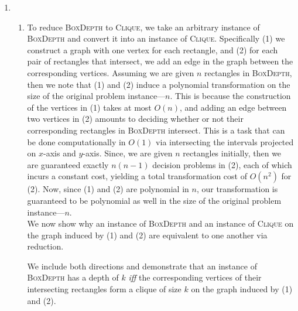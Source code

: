 \documentclass[10pt, letterpaper]{article}
\begin{document}
\begin{enumerate}[label={\bfseries Q\arabic*.}]
  \item
    \begin{enumerate}
      \item
        To reduce \textsc{BoxDepth} to \textsc{Clique}, we take an arbitrary instance of
        \textsc{BoxDepth} and convert it into an instance of \textsc{Clique}. Specifically
        (1) we construct a graph with one vertex for each rectangle, and (2) for each pair
        of rectangles that intersect, we add an edge in the graph between the corresponding
        vertices. Assuming we are given $n$ rectangles in \textsc{BoxDepth}, then we note
        that (1) and (2) induce a polynomial transformation on the size of the original
        problem instance---$n$. This is because the construction of the vertices in (1) takes
        at most $O(n)$, and adding an edge between two vertices in (2) amounts to deciding
        whether or not their corresponding rectangles in \textsc{BoxDepth} intersect. This is a task
        that can be done computationally in $O(1)$ via intersecting the intervals projected
        on $x$-axis and $y$-axis. Since, we are given $n$ rectangles initially, then we are
        guaranteed exactly $n(n-1)$ decision problems in (2), each of which incurs a constant
        cost, yielding a total transformation cost of $O(n^2)$ for (2). Now, since (1) and
        (2) are polynomial in $n$, our transformation is guaranteed to be polynomial as well
        in the size of the original problem instance---$n$. \\

        We now show why an instance of \textsc{BoxDepth} and an instance of \textsc{Clique}
        on the graph induced by (1) and (2) are equivalent to one another via reduction. \\

        \begin{proof*}
          We include both directions and demonstrate that an instance of \textsc{BoxDepth}
          has a depth of $k$ \textit{iff} the corresponding vertices of their intersecting
          rectangles form a clique of size $k$ on the graph induced by (1) and (2).
\end{proof*}
\end{enumerate}
\end{enumerate}
\end{document}
